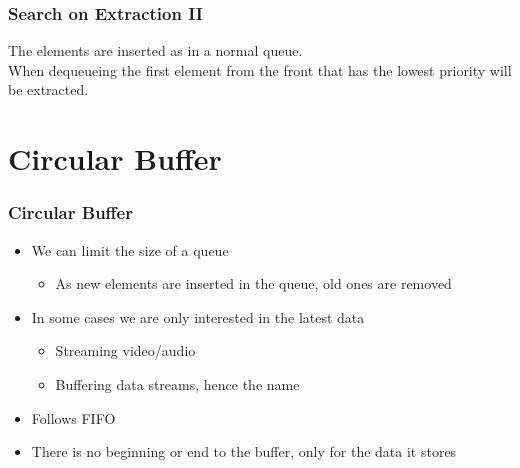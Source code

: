 \documentclass[11pt]{beamer}
\begin{document}
\begin{frame}\frametitle{Search on Extraction II}
\begin{block}{}
The elements are inserted as in a normal queue. \\
When dequeueing the first element from the front that has the lowest priority will be extracted.
\end{block}
\vspace{0.4cm}
\begin{center}
\end{center}
\end{frame}


\section{Circular Buffer}

\begin{frame}\frametitle{Circular Buffer}
\begin{itemize}
\item We can limit the size of a queue
    \begin{itemize}
    \item As new elements are inserted in the queue, old ones are removed
    \end{itemize}
\item In some cases we are only interested in the latest data
    \begin{itemize}
    \item Streaming video/audio
    \item Buffering data streams, hence the name
    \end{itemize}
\item Follows FIFO
\item There is no beginning or end to the buffer, only for the data it stores
\end{itemize}
\end{frame}
\end{document}
